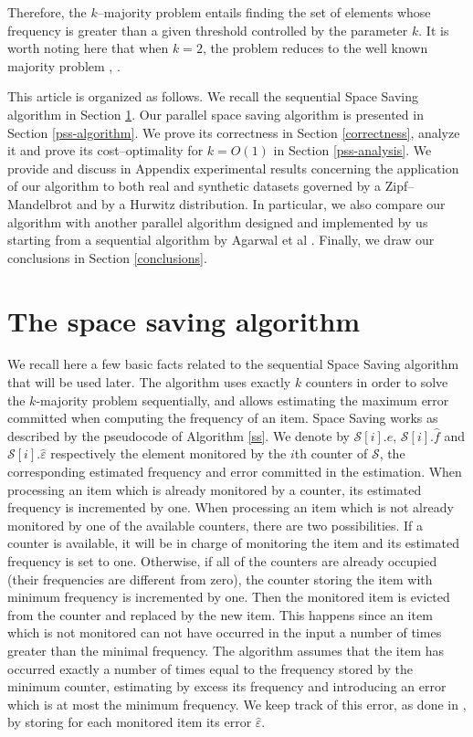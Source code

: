 \documentclass[final,3p,times]{elsarticle}
\begin{document}
Therefore, the $k$--majority problem entails finding the set of elements whose frequency is greater than a given threshold controlled by the parameter $k$. It is worth noting here that when $k = 2$, the problem reduces to the well known majority problem \cite{Moore81}, \cite{Fischer82}.

This article is organized as follows. We recall the sequential Space Saving algorithm in Section \ref{spacesaving}. Our parallel space saving algorithm is presented in Section \ref{pss-algorithm}. We prove its correctness in Section \ref{correctness},
analyze it and prove its cost--optimality for $k = O(1)$ in Section \ref{pss-analysis}. We provide and discuss in Appendix experimental results concerning the application of our algorithm to both real and synthetic datasets governed by a Zipf--Mandelbrot and by a Hurwitz distribution. In particular, we also compare our algorithm with another parallel algorithm designed and implemented by us starting from a sequential algorithm by Agarwal et al \cite{Agarwal}. Finally, we draw our conclusions in Section \ref{conclusions}.

\section{The space saving algorithm}
\label{spacesaving}

We recall here a few basic facts related to the sequential Space Saving algorithm that will be used later. The algorithm uses exactly $k$ counters in order to solve the $k$-majority problem sequentially, and allows estimating the maximum error committed when computing the frequency of an item. 
Space Saving works as described by the pseudocode of Algorithm \ref{ss}. We denote by $\mathcal{S}[i].e$, $\mathcal{S}[i].\hat{f}$ and $\mathcal{S}[i].\hat{\varepsilon}$ respectively the element monitored by the $i$th counter of $\mathcal{S}$, the corresponding estimated frequency and error committed in the estimation. When processing an item which is already monitored by a counter, its estimated frequency is incremented by one. When processing an item which is not already monitored by one of the available counters, there are two possibilities. If a counter is available, it will be in charge of monitoring the item and its estimated frequency is set to one.  Otherwise, if all of the counters are already occupied (their frequencies are different from zero), the counter storing the item with minimum frequency is incremented by one. Then the monitored item is evicted from the counter and replaced by the new item. This happens since an item which is not monitored can not have occurred in the input a number of times greater than the minimal frequency. The algorithm assumes that the item has occurred exactly a number of times equal to the frequency stored by the minimum counter, estimating by excess its frequency and introducing an error which is at most the minimum frequency. We keep track of this error, as done in \cite{Metwally2006}, by storing for each monitored item its error $\hat{\varepsilon}$.
\end{document}
